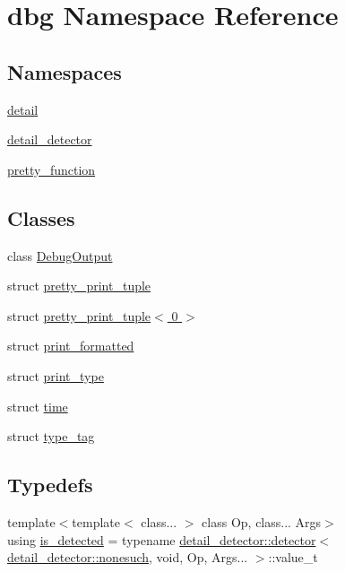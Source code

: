 \hypertarget{namespacedbg}{}\section{dbg Namespace Reference}
\label{namespacedbg}
\subsection*{Namespaces}
\begin{DoxyCompactItemize}
\item 
 \hyperlink{namespacedbg_1_1detail}{detail}
\item 
 \hyperlink{namespacedbg_1_1detail__detector}{detail\+\_\+detector}
\item 
 \hyperlink{namespacedbg_1_1pretty__function}{pretty\+\_\+function}
\end{DoxyCompactItemize}
\subsection*{Classes}
\begin{DoxyCompactItemize}
\item 
class \hyperlink{classdbg_1_1_debug_output}{Debug\+Output}
\item 
struct \hyperlink{structdbg_1_1pretty__print__tuple}{pretty\+\_\+print\+\_\+tuple}
\item 
struct \hyperlink{structdbg_1_1pretty__print__tuple_3_010_01_4}{pretty\+\_\+print\+\_\+tuple$<$ 0 $>$}
\item 
struct \hyperlink{structdbg_1_1print__formatted}{print\+\_\+formatted}
\item 
struct \hyperlink{structdbg_1_1print__type}{print\+\_\+type}
\item 
struct \hyperlink{structdbg_1_1time}{time}
\item 
struct \hyperlink{structdbg_1_1type__tag}{type\+\_\+tag}
\end{DoxyCompactItemize}
\subsection*{Typedefs}
\begin{DoxyCompactItemize}
\item 
{\footnotesize template$<$template$<$ class... $>$ class Op, class... Args$>$ }\\using \hyperlink{namespacedbg_a4fff29dc9282f3e887a7c1290477708c}{is\+\_\+detected} = typename \hyperlink{structdbg_1_1detail__detector_1_1detector}{detail\+\_\+detector\+::detector}$<$ \hyperlink{structdbg_1_1detail__detector_1_1nonesuch}{detail\+\_\+detector\+::nonesuch}, void, Op, Args... $>$\+::value\+\_\+t
\end{DoxyCompactItemize}

